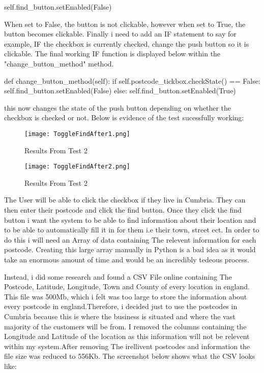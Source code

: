 \begin{python}
self.find_button.setEnabled(False)
\end{python}

When set to False, the button is not clickable, however when set to True, the button becomes clickable. Finally i need to add an IF statement to say for example, IF the checkbox is currently checked, change the push button so it is clickable. The final working IF function is displayed below within the "change_button_method" method.

\begin{python}
def change_button_method(self):
        if self.postcode_tickbox.checkState() == False:
            self.find_button.setEnabled(False)
        else:
            self.find_button.setEnabled(True)
\end{python}

this now changes the state of the push button depending on whether the checkbox is checked or not. Below is evidence of the test sucessfully working:

\begin{figure}[H]
\caption{Results From Test 2} \label{fig:Results From Test 2}
\hfill\texttt{[image: ToggleFindAfter1.png]}\hspace*{\fill}
\end{figure}

\begin{figure}[H]
\caption{Results From Test 2} \label{fig:Results From Test 2}
\hfill\texttt{[image: ToggleFindAfter2.png]}\hspace*{\fill}
\end{figure}

The User will be able to click the checkbox if they live in Cumbria. They can then enter their postcode and click the find button. Once they click the find button i want the system to be able to find information about their location and to be able to automatically fill it in for them i.e their town, street ect. In order to do this i will need an Array of data containing The relevent information for each postcode. Creating this large array manually in Python is a bad idea as it would take an enormous amount of time and would be an incredibly tedeous process.

 Instead, i did some research and found a CSV File online containing The Postcode, Latitude, Longitude, Town and County of every location in england. This file was 500Mb, which i felt was too large to store the information about every postcode in england.Therefore, i decided just to use the postcodes in Cumbria because this is where the business is situated and where the vast majority of the customers will be from. I removed the columns containing the Longitude and Latitude of the location as this information will not be relevent within my system.After removing The irellivent postcodes and information the file size was reduced to 556Kb. The screenshot below shows what the CSV looks like:


